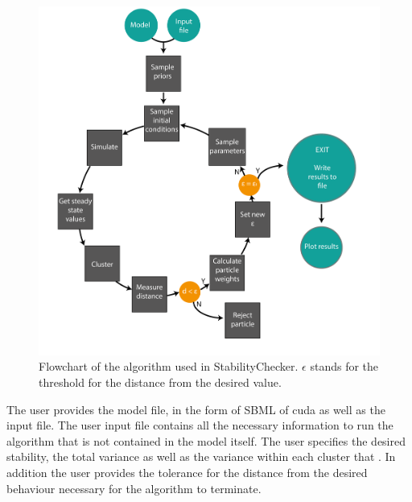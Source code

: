 \begin{figure}[p]
	\centering
	\includegraphics[scale=0.5]{chapterModelling/images/StabilityChecker_flowchart-01}
	\caption[Flowchart of the algorithm used in StabilityChecker]{Flowchart of the algorithm used in StabilityChecker. $\epsilon$ stands for the threshold for the distance from the desired value.}
	\label{fig:flowchart}
\end{figure}

 The user provides the model file, in the form of SBML of cuda as well as the input file. The user input file contains all the necessary information to run the algorithm that is not contained in the model itself. The user specifies the desired stability, the total variance as well as the variance within each cluster that . In addition the user provides the tolerance for the distance from the desired behaviour necessary for the algorithm to terminate. 

